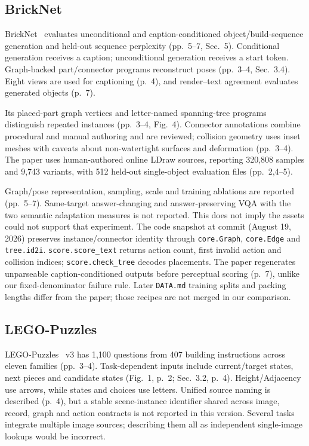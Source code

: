 \documentclass[10pt,letterpaper]{article}
\begin{document}
\subsection{BrickNet}
BrickNet~\cite{kulits2026bricknet} evaluates unconditional and
caption-conditioned object/build-sequence generation and held-out
sequence perplexity (pp.~5--7, Sec.~5). Conditional generation receives
a caption; unconditional generation receives a start token.
Graph-backed part/connector programs reconstruct poses
(pp.~3--4, Sec.~3.4). Eight views are used for captioning (p.~4),
and render--text agreement evaluates generated objects (p.~7).

Its placed-part graph vertices and letter-named spanning-tree
programs distinguish repeated instances (pp.~3--4, Fig.~4).
Connector annotations combine procedural and manual authoring and
are reviewed; collision geometry uses inset meshes with caveats
about non-watertight surfaces and deformation (pp.~3--4).
The paper uses human-authored online LDraw sources, reporting
320,808 samples and 9,743 variants, with 512 held-out single-object
evaluation files (pp.~2,4--5).

Graph/pose representation, sampling, scale and training ablations
are reported (pp.~5--7). Same-target answer-changing and answer-preserving
VQA with the two semantic adaptation measures is not reported.
This does not imply the assets could not support that experiment.
The code snapshot at commit
 (August 19, 2026)
preserves instance/connector identity through \texttt{core.Graph},
\texttt{core.Edge} and \texttt{tree.id2i}.
\texttt{score.score\_text} returns action count, first invalid action
and collision indices; \texttt{score.check\_tree} decodes placements.
The paper regenerates unparseable caption-conditioned outputs before
perceptual scoring (p.~7), unlike our fixed-denominator failure rule.
Later \texttt{DATA.md} training splits and packing lengths differ
from the paper; those recipes are not merged in our comparison.

\subsection{LEGO-Puzzles}
LEGO-Puzzles~\cite{tang2025legopuzzles} v3 has 1,100 questions from
407 building instructions across eleven families (pp.~3--4).
Task-dependent inputs include current/target states, next pieces
and candidate states (Fig.~1, p.~2; Sec.~3.2, p.~4).
Height/Adjacency use arrows, while states and choices use letters.
Unified source naming is described (p.~4), but a stable scene-instance
identifier shared across image, record, graph and action contracts is
not reported in this version. Several tasks integrate multiple image
sources; describing them all as independent single-image lookups
would be incorrect.
\end{document}
